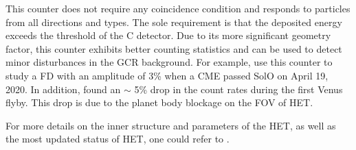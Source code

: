 This counter does not require any coincidence condition and responds to particles from all directions and types. The sole requirement is that the deposited energy exceeds the threshold of the C detector. Due to its more significant geometry factor, this counter exhibits better counting statistics and can be used to detect minor disturbances in the \ac{GCR} background. For example, \citet{Forstner-2021-SolO} use this counter to study a \ac{FD} with an amplitude of 3\% when a \ac{CME} passed \ac{SolO} on April 19, 2020. In addition, \citet{Allen2021AA_venus} found an $\sim$ 5\% drop in the count rates during the first Venus flyby. This drop is due to the planet body blockage on the \ac{FOV} of \ac{HET}.



For more details on the inner structure and parameters of the \ac{HET}, as well as the most updated status of \ac{HET}, one could refer to \citet{RodriguezPacheco-2019-EPD, Wimmer2021AA,Elftmann-2020-PhD}.

